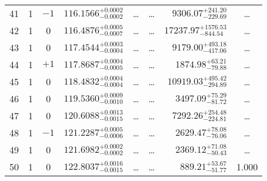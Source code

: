 \begin{table*}[!]
\begin{tabular}{llcrrlrc}
41 & 1 & $-1$ & $    116.1566_{-      0.0002}^{+      0.0002}$ & \multicolumn{1}{c}{\dots} & \multicolumn{1}{c}{\dots} & $     9306.07_{-      229.69}^{+      241.20}$ & \dots \\[1pt]
42 & 1 & 0 & $    116.4876_{-      0.0007}^{+      0.0005}$ & \multicolumn{1}{c}{\dots} & \multicolumn{1}{c}{\dots} & $    17237.97_{-      844.54}^{+     1576.53}$ & \dots \\[1pt]
43 & 1 & 0 & $    117.4544_{-      0.0004}^{+      0.0003}$ & \multicolumn{1}{c}{\dots} & \multicolumn{1}{c}{\dots} & $     9179.00_{-      417.06}^{+      493.18}$ & \dots \\[1pt]
44 & 1 & $+1$ & $    117.8687_{-      0.0005}^{+      0.0004}$ & \multicolumn{1}{c}{\dots} & \multicolumn{1}{c}{\dots} & $     1874.98_{-       79.88}^{+       63.21}$ & \dots \\[1pt]
45 & 1 & 0 & $    118.4832_{-      0.0004}^{+      0.0004}$ & \multicolumn{1}{c}{\dots} & \multicolumn{1}{c}{\dots} & $    10919.03_{-      294.89}^{+      495.42}$ & \dots \\[1pt]
46 & 1 & 0 & $    119.5360_{-      0.0010}^{+      0.0009}$ & \multicolumn{1}{c}{\dots} & \multicolumn{1}{c}{\dots} & $     3497.09_{-       81.72}^{+       75.29}$ & \dots \\[1pt]
47 & 1 & 0 & $    120.6088_{-      0.0015}^{+      0.0013}$ & \multicolumn{1}{c}{\dots} & \multicolumn{1}{c}{\dots} & $     7292.26_{-      224.81}^{+      254.48}$ & \dots \\[1pt]
48 & 1 & $-1$ & $    121.2287_{-      0.0006}^{+      0.0005}$ & \multicolumn{1}{c}{\dots} & \multicolumn{1}{c}{\dots} & $     2629.47_{-       76.06}^{+       78.08}$ & \dots \\[1pt]
49 & 1 & 0 & $    121.6982_{-      0.0002}^{+      0.0002}$ & \multicolumn{1}{c}{\dots} & \multicolumn{1}{c}{\dots} & $     2369.12_{-       50.43}^{+       71.08}$ & \dots \\[1pt]

50 & 1 & 0 & $    122.8037_{-      0.0015}^{+      0.0016}$ & \multicolumn{1}{c}{\dots} & \multicolumn{1}{c}{\dots} & $      889.21_{-       51.77}^{+       53.67}$ & 1.000\\[1pt]

\hline
\end{tabular}
\end{table*}


